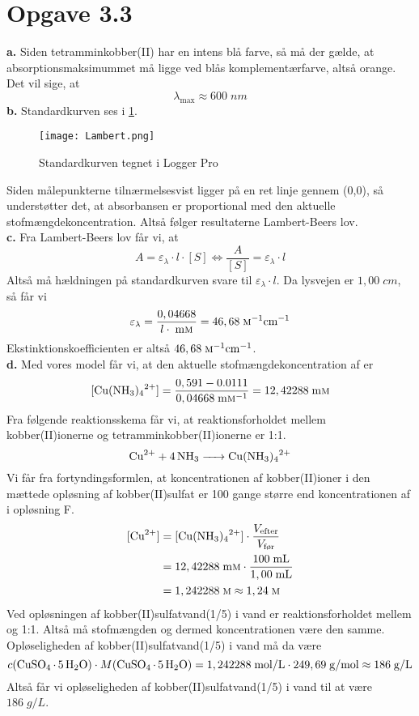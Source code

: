 \documentclass{report}
\begin{document}
\section*{Opgave 3.3}
\textbf{a.} Siden tetramminkobber(II) har en intens blå farve, så må der gælde, at absorptionsmaksimummet må ligge ved blås komplementærfarve, altså orange.
Det vil sige, at
\[
\lambda_{\text{max} }\approx 600 \;\unit{nm} 
\] 
\textbf{b.} Standardkurven ses i \cref{fig:Lambert}.
\begin{figure}[H]
\begin{center}
  \texttt{[image: Lambert.png]}
\end{center}
\caption{Standardkurven tegnet i Logger Pro}
\label{fig:Lambert}
\end{figure}
Siden målepunkterne tilnærmelsesvist ligger på en ret linje gennem (0,0), så understøtter det, at absorbansen er proportional med den aktuelle stofmængdekoncentration.
Altså følger resultaterne Lambert-Beers lov. \\[1ex]
\textbf{c.} Fra Lambert-Beers lov får vi, at 
\[
A=\varepsilon_\lambda \cdot l\cdot [S] \iff \frac{A}{[S]}=\varepsilon_\lambda \cdot l
\] 
Altså må hældningen på standardkurven svare til $\varepsilon_\lambda \cdot l$. 
Da lysvejen er $1,00 \;\unit{cm} $, så får vi
\[
\varepsilon_\lambda=\frac{0,04668}{ l\cdot \;\unit{m \textsc{m}}}=46,68 \;\unit{\textsc{m}^{-1}cm^{-1}} 
\] 
Ekstinktionskoefficienten er altså $46,68 \;\unit{\textsc{m}^{-1}cm^{-1}} $. \\[1ex]
\textbf{d.} 
Med vores model får vi, at den aktuelle stofmængdekoncentration af  er
\[
[\ce{Cu(NH3)4^2+}]=\frac{0,591-0.0111}{0,04668 \;\unit{m\textsc{m}^{-1}} }=12,42288 \;\unit{m\textsc{m}} 
\]
Fra følgende reaktionsskema får vi, at reaktionsforholdet mellem kobber(II)ionerne og tetramminkobber(II)ionerne er 1:1.
\[
\ce{Cu^2+ + 4NH3 -> Cu(NH3)4^2+} 
\] 
Vi får fra fortyndingsformlen, at koncentrationen af kobber(II)ioner i den mættede opløsning af kobber(II)sulfat er 100 gange større end koncentrationen af  i opløsning F.
\begin{equation*}
\begin{split}
  [\ce{Cu^2+} ]&=[\ce{Cu(NH3)4^2+}]\cdot \frac{V_{\text{efter} }}{V_{\text{før} }}\\ 
  &=12,42288 \;\unit{m\textsc{m}} \cdot \frac{100 \;\unit{mL} }{1,00 \;\unit{mL} }\\ 
  &=1,242288 \;\textsc{m} \approx 1,24 \;\textsc{m} 
\end{split}
\end{equation*}
Ved opløsningen af kobber(II)sulfatvand(1/5) i vand er reaktionsforholdet mellem  og  1:1.
Altså må stofmængden og dermed koncentrationen være den samme.
Opløseligheden af kobber(II)sulfatvand(1/5) i vand må da være 
\[
c(\ce{CuSO4.5H2O})\cdot M(\ce{CuSO4.5H2O})=1,242288 \;\unit{mol/L} \cdot 249,69 \;\unit{g/mol} \approx 186 \;\unit{g/L} 
\] 
Altså får vi opløseligheden af kobber(II)sulfatvand(1/5) i vand til at være $186 \;\unit{g/L} $.
\end{document}
